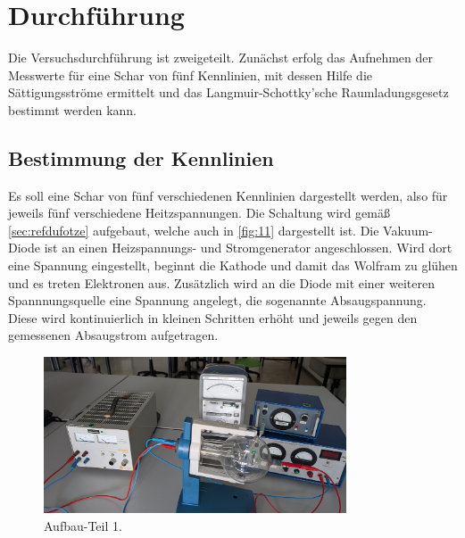 \section{Durchführung}
\label{sec:Durchführung}

Die Versuchsdurchführung ist zweigeteilt. Zunächst erfolg das Aufnehmen der
Messwerte für eine Schar von fünf Kennlinien, mit dessen Hilfe die Sättigungsströme 
ermittelt und das Langmuir-Schottky’sche Raumladungsgesetz bestimmt werden kann.

\subsection{Bestimmung der Kennlinien}
\label{sec:1}
Es soll eine Schar von fünf verschiedenen Kennlinien dargestellt werden, 
also für jeweils fünf verschiedene Heitzspannungen. Die Schaltung wird gemäß
\autoref{sec:refdufotze} aufgebaut, welche auch in \autoref{fig:11} dargestellt ist.
Die Vakuum-Diode ist an einen Heizspannungs- und Stromgenerator angeschlossen.
Wird dort eine Spannung eingestellt, beginnt die Kathode und damit das Wolfram
zu glühen und es treten Elektronen aus.
Zusätzlich wird an die Diode mit einer weiteren Spannnungsquelle eine Spannung
angelegt, die sogenannte \glqq Absaugspannung\grqq{}. Diese wird kontinuierlich
in kleinen Schritten erhöht und jeweils gegen den gemessenen Absaugstrom
aufgetragen.
\begin{figure}[H]
    \centering
        \centering
        \includegraphics[width=0.8\textwidth]{Bilder/2.jpg}
        \caption{Aufbau-Teil 1.}
    \hfill
    \label{fig:11}
\end{figure}

